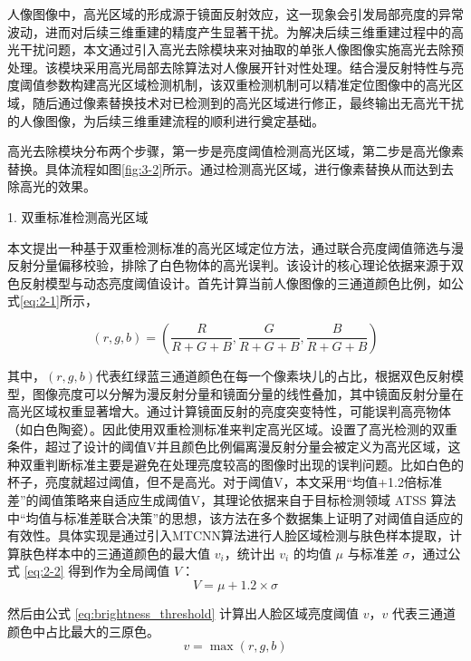 人像图像中，高光区域的形成源于镜面反射效应，这一现象会引发局部亮度的异常波动，进而对后续三维重建的精度产生显著干扰。为解决后续三维重建过程中的高光干扰问题，本文通过引入高光去除模块来对抽取的单张人像图像实施高光去除预处理。该模块采用高光局部去除算法对人像展开针对性处理。结合漫反射特性与亮度阈值参数构建高光区域检测机制，该双重检测机制可以精准定位图像中的高光区域，随后通过像素替换技术对已检测到的高光区域进行修正，最终输出无高光干扰的人像图像，为后续三维重建流程的顺利进行奠定基础。

高光去除模块分布两个步骤，第一步是亮度阈值检测高光区域，第二步是高光像素替换。具体流程如图\ref{fig:3-2}所示。通过检测高光区域，进行像素替换从而达到去除高光的效果。

1.	双重标准检测高光区域

本文提出一种基于双重检测标准的高光区域定位方法，通过联合亮度阈值筛选与漫反射分量偏移校验，排除了白色物体的高光误判。该设计的核心理论依据来源于双色反射模型\cite{Shafer1985}与动态亮度阈值设计\cite{蔡慧2009}。首先计算当前人像图像的三通道颜色比例，如公式\eqref{eq:2-1}所示，

\begin{equation}
\label{eq:2-1}
(r, g, b) = \left( \frac{R}{R+G+B}, \frac{G}{R+G+B}, \frac{B}{R+G+B} \right)
\end{equation}

其中，\((r, g, b)\)代表红绿蓝三通道颜色在每一个像素块儿的占比，根据双色反射模型，图像亮度可以分解为漫反射分量和镜面分量的线性叠加，其中镜面反射分量在高光区域权重显著增大。通过计算镜面反射的亮度突变特性，可能误判高亮物体（如白色陶瓷）。因此使用双重检测标准来判定高光区域。设置了高光检测的双重条件，超过了设计的阈值V并且颜色比例偏离漫反射分量会被定义为高光区域，这种双重判断标准主要是避免在处理亮度较高的图像时出现的误判问题。比如白色的杯子，亮度就超过阈值，但不是高光。对于阈值V，本文采用“均值+1.2倍标准差”的阈值策略来自适应生成阈值V，其理论依据来自于目标检测领域 ATSS 算法\cite{Zhang2020}中“均值与标准差联合决策”的思想，该方法在多个数据集上证明了对阈值自适应的有效性。具体实现是通过引入MTCNN算法\cite{Zhang2016}进行人脸区域检测与肤色样本提取，计算肤色样本中的三通道颜色的最大值 \(v_i\)，统计出 \(v_i\) 的均值 \(\mu\) 与标准差 \(\sigma\)，通过公式 \eqref{eq:2-2} 得到作为全局阈值 \(V\)：
\begin{equation}
\label{eq:2-2}
V = \mu + 1.2 \times \sigma
\end{equation}

然后由公式 \eqref{eq:brightness_threshold} 计算出人脸区域亮度阈值 \(v\)，\(v\) 代表三通道颜色中占比最大的三原色。
\begin{equation}
\label{eq:brightness_threshold}
v = \max(r, g, b)
\end{equation}

